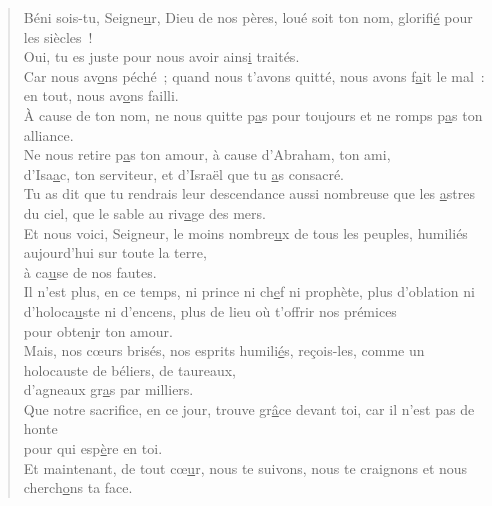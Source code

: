 \begin{verse}
Béni sois-tu, Seigne\underline{u}r, Dieu de nos pères,\psalmstar
loué soit ton nom, glorifi\underline{é} pour les siècles !\\

Oui, tu es juste\psalmstar
pour nous avoir ains\underline{i} traités.\\

Car nous av\underline{o}ns péché ; \psalmdagger
quand nous t'avons quitté, nous avons f\underline{a}it le mal :\\
en tout, nous av\underline{o}ns failli.\\

À cause de ton nom,\psalmstar
ne nous quitte p\underline{a}s pour toujours \psalmstar
et ne romps p\underline{a}s ton alliance.\\

Ne nous retire p\underline{a}s ton amour, \psalmdagger
à cause d'Abraham, ton ami,\\
d'Isa\underline{a}c, ton serviteur, \psalmstar
et d'Israël que tu \underline{a}s consacré.\\

Tu as dit que tu rendrais leur descendance\psalmstar
aussi nombreuse que les \underline{a}stres du ciel, \psalmstar
que le sable au riv\underline{a}ge des mers.\\

Et nous voici, Seigneur,\psalmstar
le moins nombre\underline{u}x de tous les peuples, \psalmstar
humiliés aujourd'hui sur toute la terre,\\
à ca\underline{u}se de nos fautes.\\

Il n'est plus, en ce temps,\psalmstar
ni prince ni ch\underline{e}f ni prophète, \psalmdagger
plus d'oblation ni d'holoca\underline{u}ste ni d'encens, \psalmstar
plus de lieu où t'offrir nos prémices\\
pour obten\underline{i}r ton amour.\\

Mais, nos cœurs brisés,\psalmstar
nos esprits humili\underline{é}s, reçois-les, \psalmstar
comme un holocauste de béliers, de taureaux,\\
d'agneaux gr\underline{a}s par milliers.\\

Que notre sacrifice, en ce jour,\psalmstar
trouve gr\underline{â}ce devant toi, \psalmstar
car il n'est pas de honte\\
pour qui esp\underline{è}re en toi.\\

Et maintenant, de tout cœ\underline{u}r, nous te suivons,\psalmstar
nous te craignons et nous cherch\underline{o}ns ta face.
\end{verse}

